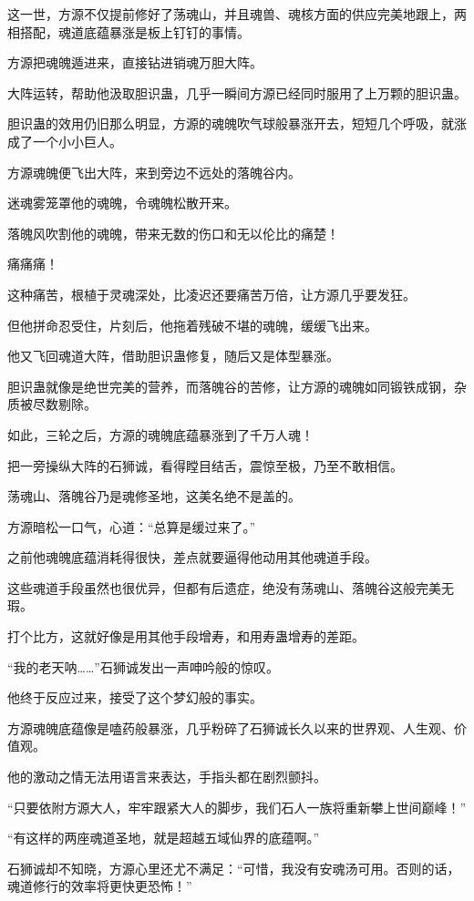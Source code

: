\begin{this_body}
这一世，方源不仅提前修好了荡魂山，并且魂兽、魂核方面的供应完美地跟上，两相搭配，魂道底蕴暴涨是板上钉钉的事情。

方源把魂魄遁进来，直接钻进销魂万胆大阵。

大阵运转，帮助他汲取胆识蛊，几乎一瞬间方源已经同时服用了上万颗的胆识蛊。

胆识蛊的效用仍旧那么明显，方源的魂魄吹气球般暴涨开去，短短几个呼吸，就涨成了一个小小巨人。

方源魂魄便飞出大阵，来到旁边不远处的落魄谷内。

迷魂雾笼罩他的魂魄，令魂魄松散开来。

落魄风吹割他的魂魄，带来无数的伤口和无以伦比的痛楚！

痛痛痛！

这种痛苦，根植于灵魂深处，比凌迟还要痛苦万倍，让方源几乎要发狂。

但他拼命忍受住，片刻后，他拖着残破不堪的魂魄，缓缓飞出来。

他又飞回魂道大阵，借助胆识蛊修复，随后又是体型暴涨。

胆识蛊就像是绝世完美的营养，而落魄谷的苦修，让方源的魂魄如同锻铁成钢，杂质被尽数剔除。

如此，三轮之后，方源的魂魄底蕴暴涨到了千万人魂！

把一旁操纵大阵的石狮诚，看得瞠目结舌，震惊至极，乃至不敢相信。

荡魂山、落魄谷乃是魂修圣地，这美名绝不是盖的。

方源暗松一口气，心道：“总算是缓过来了。”

之前他魂魄底蕴消耗得很快，差点就要逼得他动用其他魂道手段。

这些魂道手段虽然也很优异，但都有后遗症，绝没有荡魂山、落魄谷这般完美无瑕。

打个比方，这就好像是用其他手段增寿，和用寿蛊增寿的差距。

“我的老天呐……”石狮诚发出一声呻吟般的惊叹。

他终于反应过来，接受了这个梦幻般的事实。

方源魂魄底蕴像是嗑药般暴涨，几乎粉碎了石狮诚长久以来的世界观、人生观、价值观。

他的激动之情无法用语言来表达，手指头都在剧烈颤抖。

“只要依附方源大人，牢牢跟紧大人的脚步，我们石人一族将重新攀上世间巅峰！”

“有这样的两座魂道圣地，就是超越五域仙界的底蕴啊。”

石狮诚却不知晓，方源心里还尤不满足：“可惜，我没有安魂汤可用。否则的话，魂道修行的效率将更快更恐怖！”


\end{this_body}
